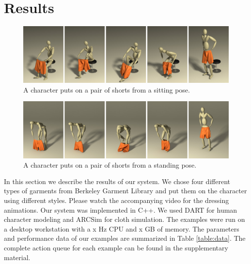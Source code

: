 \section{Results}

\begin{figure}[!t]
  \centering
  \includegraphics[width=\textwidth]{images/shortsSitting}
  \caption{A character puts on a pair of shorts from a sitting pose.}
  \label{fig:shorts1}
\end{figure}

\begin{figure}[!t]
  \centering
  \includegraphics[width=\textwidth]{images/shortsStanding}
  \caption{A character puts on a pair of shorts from a standing pose.}
  \label{fig:shorts2}
\end{figure}

In this section we describe the results of our system. We chose four different types of garments from Berkeley Garment Library \cite{}  and put them on the character using different styles. Please watch the accompanying video for the dressing animations. Our system was implemented in C++. We used DART \cite{} for human character modeling and ARCSim \cite{} for cloth simulation. The examples were run on a desktop workstation with a x Hz CPU and x GB of memory. The parameters and performance data of our examples are summarized in Table \ref{table:data}. The complete action queue for each example can be found in the supplementary material.

